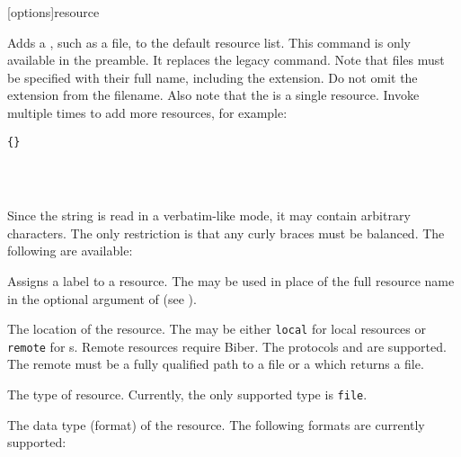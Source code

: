 \documentclass{ltxdockit}[2011/03/25]
\newcommand*{\biber}{Biber\xspace}
\begin{document}
\begin{ltxsyntax}

[options]{resource}

Adds a , such as a  file, to the default resource list. This command is only available in the preamble. It replaces the  legacy command. Note that files must be specified with their full name, including the extension. Do not omit the  extension from the filename. Also note that the  is a single resource. Invoke  multiple times to add more resources, for example:

\begin{lstlisting}[style=latex]{}




\end{lstlisting}
%
Since the  string is read in a verbatim-like mode, it may contain arbitrary characters. The only restriction is that any curly braces must be balanced. The following  are available:

\begin{optionlist*}


Assigns a label to a resource. The  may be used in place of the full resource name in the optional argument of  (see ).


The location of the resource. The  may be either \texttt{local} for local resources or \texttt{remote} for s. Remote resources require \biber. The protocols  and  are supported. The remote  must be a fully qualified path to a  file or a  which returns a  file.


The type of resource. Currently, the only supported type is \texttt{file}.


The data type (format) of the resource. The following formats are currently supported:

\begin{valuelist}[bibtex]


\end{valuelist}
\end{optionlist*}
\end{ltxsyntax}
\end{document}
